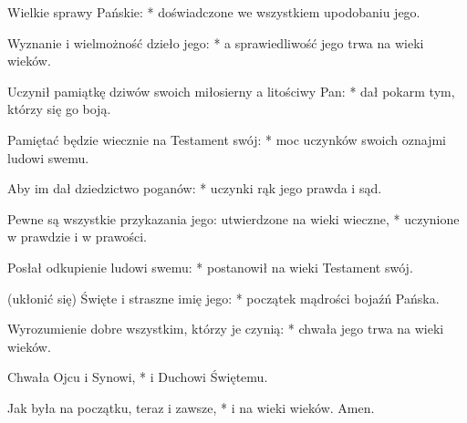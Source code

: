 ﻿\item Wielkie sprawy Pańskie: * doświadczone we wszystkiem upodobaniu jego.
\item Wyznanie i wielmożność dzieło jego: * a sprawiedliwość jego trwa na wieki wieków.
\item Uczynił pamiątkę dziwów swoich miłosierny a litościwy Pan: * dał pokarm tym, którzy się go boją.
\item Pamiętać będzie wiecznie na Testament swój: * moc uczynków swoich oznajmi ludowi swemu.
\item Aby im dał dziedzictwo poganów: * uczynki rąk jego prawda i sąd.
\item Pewne są wszystkie przykazania jego: utwierdzone na wieki wieczne, * uczynione w prawdzie i w prawości.
\item Posłał odkupienie ludowi swemu: * postanowił na wieki Testament swój.
\item (ukłonić się) Święte i straszne imię jego: * początek mądrości bojaźń Pańska.
\item  Wyrozumienie dobre wszystkim, którzy je czynią: * chwała jego trwa na wieki wieków.
\item Chwała Ojcu i Synowi, * i Duchowi Świętemu.
\item Jak była na początku, teraz i zawsze, * i na wieki wieków. Amen.